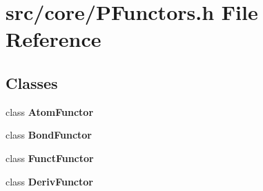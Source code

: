 \section{src/core/PFunctors.h File Reference}
\label{PFunctors_8h}


\subsection*{Classes}
\begin{CompactItemize}
\item 
class {\bf Atom\-Functor}
\item 
class {\bf Bond\-Functor}
\item 
class {\bf Funct\-Functor}
\item 
class {\bf Deriv\-Functor}
\end{CompactItemize}
